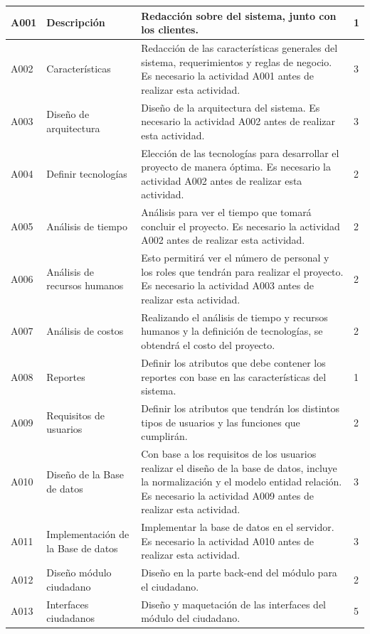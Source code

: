 \documentclass[12pt,twoside]{article}
\begin{document}
\begin{longtable}{|l|m{3cm}|m{6cm}|m{2cm}|}
    A001 & Descripción & Redacción sobre del sistema, junto con los clientes. & 1 \\ \hline
    A002 & Características & Redacción de las características generales del sistema, requerimientos y reglas de negocio. Es necesario la actividad A001 antes de realizar esta actividad. & 3 \\ \hline
    A003 & Diseño de arquitectura & Diseño de la arquitectura del sistema. Es necesario la actividad A002 antes de realizar esta actividad. & 3 \\ \hline
    A004 & Definir tecnologías & Elección de las tecnologías para desarrollar el proyecto de manera óptima. Es necesario la actividad A002 antes de realizar esta actividad. & 2 \\ \hline
    A005 & Análisis de tiempo & Análisis para ver el tiempo que tomará concluir el proyecto. Es necesario la actividad A002 antes de realizar esta actividad. & 2 \\ \hline
    A006 & Análisis de recursos humanos & Esto permitirá ver el número de personal y los roles que tendrán para realizar el proyecto. Es necesario la actividad A003 antes de realizar esta actividad. & 2 \\ \hline
    A007 & Análisis de costos & Realizando el análisis de tiempo y recursos humanos y la definición de tecnologías, se obtendrá el costo del proyecto. & 2 \\ \hline
    A008 & Reportes & Definir los atributos que debe contener los reportes con base en las características del sistema. & 1 \\ \hline
    A009 & Requisitos de usuarios & Definir los atributos que tendrán los distintos tipos de usuarios y las funciones que cumplirán. & 2 \\ \hline
    A010 & Diseño de la Base de datos & Con base a los requisitos de los usuarios realizar el diseño de la base de datos, incluye la normalización y el modelo entidad relación. Es necesario la actividad A009 antes de realizar esta actividad. & 3 \\ \hline
    A011 & Implementación de la Base de datos & Implementar la base de datos en el servidor. Es necesario la actividad A010 antes de realizar esta actividad. & 3 \\ \hline
    A012 & Diseño módulo ciudadano & Diseño en la parte back-end del módulo para el ciudadano. & 2 \\ \hline
    A013 & Interfaces ciudadanos & Diseño y maquetación de las interfaces del módulo del ciudadano. & 5 \\ \hline

\end{longtable}
\end{document}
